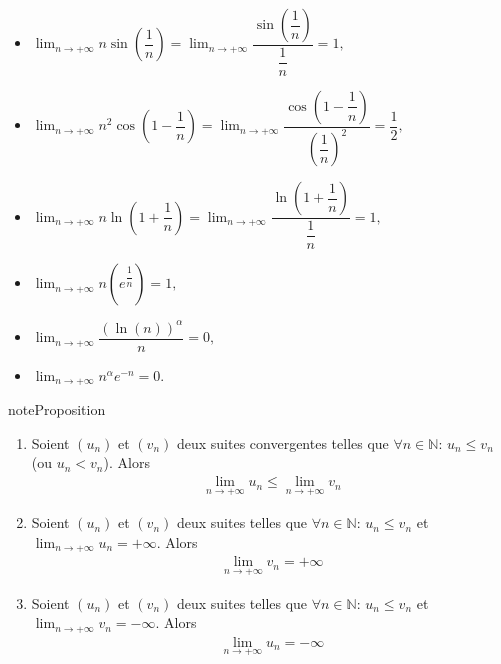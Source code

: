 \documentclass[letterpaper,10pt,french]{jupyterBook}
\begin{document}
\sphinxAtStartPar
{}
\begin{itemize}
\item {} 
\sphinxAtStartPar
\(\lim_{n \rightarrow +\infty} n\sin(\dfrac{1}{n})=\lim_{n \rightarrow +\infty}\dfrac{\sin(\dfrac{1}{n})}{\dfrac{1}{n}}=1,\)

\item {} 
\sphinxAtStartPar
\(\lim_{n \rightarrow +\infty}n^2\cos (1-\dfrac{1}{n})=\lim_{n \rightarrow +\infty}\dfrac{\cos(1-\dfrac{1}{n})}{(\dfrac{1}{n})^2}=\dfrac{1}{2},\)

\item {} 
\sphinxAtStartPar
\(\lim_{n \rightarrow +\infty} n\ln(1+\dfrac{1}{n})=\lim_{n \rightarrow +\infty}\dfrac{\ln(1+\dfrac{1}{n})}{\dfrac{1}{n}}=1,\)

\item {} 
\sphinxAtStartPar
\(\lim_{n \rightarrow +\infty} n(e^{\dfrac{1}{n}})=1,\)

\item {} 
\sphinxAtStartPar
\(\lim_{n \rightarrow +\infty} \dfrac{(\ln (n))^{\alpha}}{n}=0,\)

\item {} 
\sphinxAtStartPar
\(\lim_{n \rightarrow +\infty} n^{\alpha}e^{-n}=0.\)

\end{itemize}

\begin{sphinxadmonition}{note}{Proposition}
\begin{enumerate}
%
\item {} 
\sphinxAtStartPar
Soient \((u_n)\) et \((v_n)\) deux suites convergentes telles que \(\forall n\in \mathbb{N}:\, u_n \leq v_n\) (ou \(u_n < v_n\)). Alors
\begin{equation*}
\begin{split}
    \lim_{n \rightarrow +\infty} u_n \leq \lim_{n \rightarrow +\infty} v_n
    \end{split}
\end{equation*}
\item {} 
\sphinxAtStartPar
Soient \((u_n)\) et \((v_n)\) deux suites telles que \(\forall n\in \mathbb{N}:\,u_n\leq v_n\) et \(\lim_{n \rightarrow +\infty} u_n=+\infty.\) Alors
\begin{equation*}
\begin{split}
    \lim_{n \rightarrow +\infty} v_n=+\infty
    \end{split}
\end{equation*}
\item {} 
\sphinxAtStartPar
Soient \((u_n)\) et \((v_n)\) deux suites telles que \(\forall n\in \mathbb{N}:\,u_n\leq v_n\) et \(\lim_{n \rightarrow +\infty} v_n=-\infty.\) Alors
\begin{equation*}
\begin{split}
    \lim_{n \rightarrow +\infty} u_n=-\infty
    \end{split}
\end{equation*}
\end{enumerate}
\end{sphinxadmonition}
\end{document}
